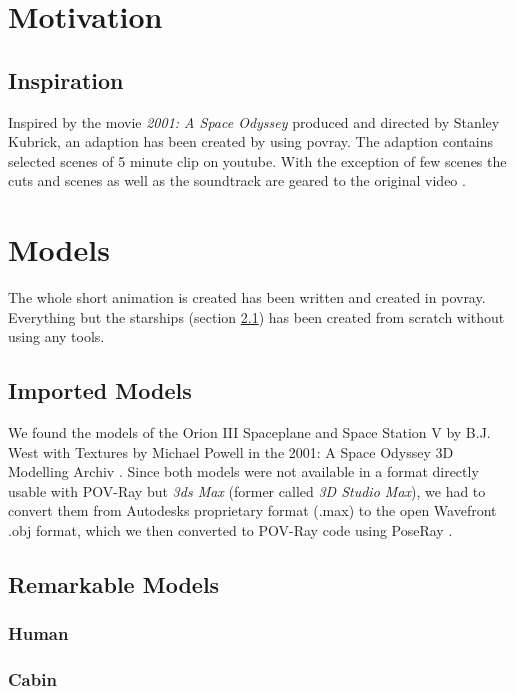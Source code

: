 
\chapter{Motivation}
\section{Inspiration}
Inspired by the movie \textit{2001: A Space Odyssey} produced and directed by Stanley Kubrick, an adaption has been created by using povray. The adaption contains selected scenes of 5 minute clip on youtube.  With the exception of few scenes the cuts and scenes as well as the soundtrack are geared to the original video  \cite{EbClectic}.

\chapter{Models}
The whole short animation is created has been written and created in povray. Everything but the starships (section \ref{imported_models}) has been created from scratch without using any tools.

\section{Imported Models} \label{imported_models}

We found the models of the Orion III Spaceplane and Space Station V by B.J. West with Textures by Michael Powell in the 2001: A Space Odyssey 3D Modelling Archiv \cite{Archive}.
Since both models were not available in a format directly usable with POV-Ray but \textit{3ds Max} (former called \textit{3D Studio Max}), we had to convert them from Autodesks proprietary format (.max) to the open Wavefront .obj format, which we then converted to POV-Ray code using PoseRay \cite{PoseRay}.

\section{Remarkable Models}
\subsection{Human} \label{human_model}
\subsection{Cabin} 
\newpage
